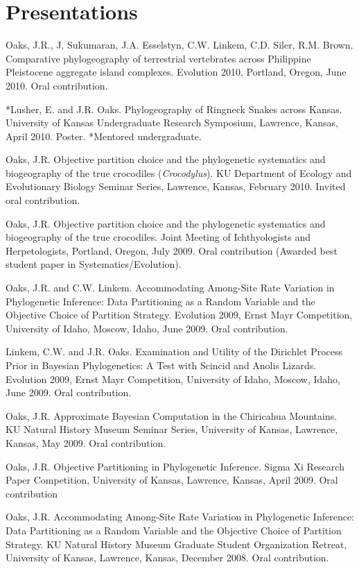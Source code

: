 \documentclass[10pt]{article}
\newcommand{\myHangIndent}{\hangindent=5mm}
\begin{document}
\section*{Presentations}
\myHangIndent
Oaks, J.R., J. Sukumaran, J.A. Esselstyn, C.W. Linkem, C.D. Siler, R.M. Brown.
Comparative phylogeography of terrestrial vertebrates across Philippine Pleistocene aggregate island complexes.
Evolution 2010, Portland, Oregon, June 2010.
Oral contribution.

\myHangIndent
*Lusher, E. and J.R. Oaks.
Phylogeography of Ringneck Snakes across Kansas.
University of Kansas Undergraduate Research Symposium, Lawrence, Kansas, April 2010.
Poster.
*Mentored undergraduate.

\myHangIndent
Oaks, J.R.
Objective partition choice and the phylogenetic systematics and biogeography of the true crocodiles (\emph{Crocodylus}).
KU Department of Ecology and Evolutionary Biology Seminar Series, Lawrence, Kansas, February 2010.
Invited oral contribution.

\myHangIndent
Oaks, J.R.
Objective partition choice and the phylogenetic systematics and biogeography of the true crocodiles.
Joint Meeting of Ichthyologists and Herpetologists, Portland, Oregon, July 2009.
Oral contribution (Awarded best student paper in Systematics/Evolution).

\myHangIndent
Oaks, J.R. and C.W. Linkem.
Accommodating Among-Site Rate Variation in Phylogenetic Inference: Data Partitioning as a Random Variable and the Objective Choice of Partition Strategy.
Evolution 2009, Ernst Mayr Competition, University of Idaho, Moscow, Idaho, June 2009.
Oral contribution.

\myHangIndent
Linkem, C.W. and J.R. Oaks.
Examination and Utility of the Dirichlet Process Prior in Bayesian Phylogenetics: A Test with Scincid and Anolis Lizards.
Evolution 2009, Ernst Mayr Competition, University of Idaho, Moscow, Idaho, June 2009.
Oral contribution.

\myHangIndent
Oaks, J.R.
Approximate Bayesian Computation in the Chiricahua Mountains.
KU Natural History Museum Seminar Series, University of Kansas, Lawrence, Kansas, May 2009.
Oral contribution.

\myHangIndent
Oaks, J.R.
Objective Partitioning in Phylogenetic Inference.
Sigma Xi Research Paper Competition, University of Kansas, Lawrence, Kansas, April 2009.
Oral contribution

\myHangIndent
Oaks, J.R.
Accommodating Among-Site Rate Variation in Phylogenetic Inference: Data Partitioning as a Random Variable and the Objective Choice of Partition Strategy.
KU Natural History Museum Graduate Student Organization Retreat, University of Kansas, Lawrence, Kansas, December 2008.
Oral contribution.
\end{document}
